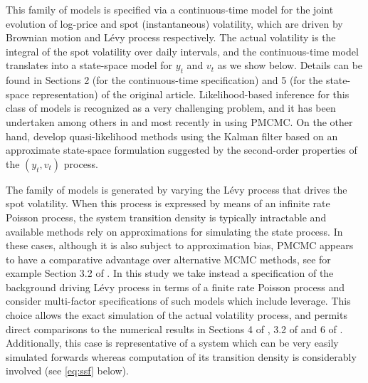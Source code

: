\documentclass{statsoc}
\begin{document}
This family of models is specified via a  continuous-time model for the joint
evolution of log-price and spot (instantaneous)
volatility, which are driven by
Brownian motion and L\'evy process respectively. The actual volatility
is the integral of the spot volatility over daily intervals, and the
continuous-time model  translates into
a state-space model for $y_t$ and $v_t$ as we show below.   Details can be
found in Sections 2 (for the continuous-time specification) and 5
(for the state-space
representation) of the original article.
 Likelihood-based inference for this class of models is recognized
 as a very challenging problem, and it 
 has been
undertaken among others in \cite{robe:papa:dell:2004,grif:steel:ou}
and most recently in \cite{PMCMC} using PMCMC. On the other hand,
\cite{bns:real} develop quasi-likelihood methods using the Kalman filter based on an
approximate state-space formulation suggested by the second-order properties
of the $(y_t,v_t)$ process.  


The family of models is generated by varying  the
L\'evy process that drives the spot volatility. When this process is
expressed by means of an infinite 
rate Poisson process, the system transition density is typically
intractable and available  methods rely on
approximations for simulating the state process. In these cases, 
although it is also subject to approximation bias, PMCMC appears to
have a comparative advantage over alternative MCMC 
methods, see for example  Section 3.2 of \cite{PMCMC}.  
In this study we take instead a specification of the background
driving L\'evy process  in terms of a finite rate Poisson process and consider 
multi-factor specifications of such models which include
leverage. This choice allows the exact simulation of the actual
volatility process, and permits direct comparisons to  the numerical
results  in Sections 4 of \cite{robe:papa:dell:2004}, 3.2 of 
\cite{bns:real} and 6 of \cite{grif:steel:ou}. Additionally, this case
is representative  of a system which can be very easily simulated
forwards whereas computation of its transition density is considerably
involved (see \eqref{eq:ssf} below). 
\end{document}
